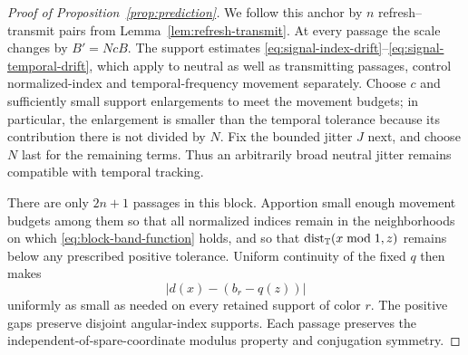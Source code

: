 \begin{proof}[Proof of Proposition~\ref{prop:prediction}]
We follow this anchor by $n$ refresh--transmit pairs from
Lemma~\ref{lem:refresh-transmit}. At every passage the scale changes by
$B'=NcB$. The support estimates
\eqref{eq:signal-index-drift}--\eqref{eq:signal-temporal-drift}, which
apply to neutral as well as transmitting passages, control normalized-index
and temporal-frequency movement separately. Choose $c$ and sufficiently
small support enlargements to meet the movement budgets; in particular,
the enlargement is smaller than the temporal tolerance because its
contribution there is not divided by $N$. Fix the bounded jitter $J$
next, and choose $N$ last for the remaining terms. Thus an arbitrarily
broad neutral jitter remains compatible with temporal tracking.

There are only $2n+1$ passages in this block.  Apportion small enough
movement budgets among them so that all normalized indices remain
in the neighborhoods on which \eqref{eq:block-band-function} holds,
and so that $\operatorname{dist}_{\mathbb T}(x\bmod1,z)$ remains below any prescribed
positive tolerance.  Uniform continuity of the fixed $q$ then makes
\begin{equation}
 |d(x)-(b_r-q(z))|
 \label{eq:block-substitution}
\end{equation}
uniformly as small as needed on every retained support of color $r$.
The positive gaps preserve disjoint angular-index supports.  Each
passage preserves the independent-of-spare-coordinate modulus
property and conjugation symmetry.


\end{proof}
